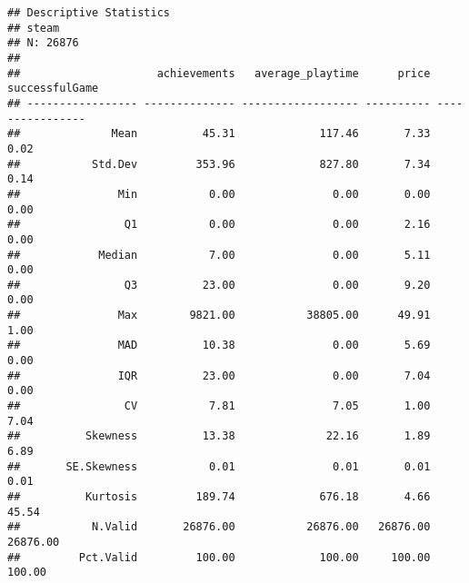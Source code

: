 \documentclass[]{article}
\begin{document}
\begin{verbatim}
## Descriptive Statistics  
## steam  
## N: 26876  
## 
##                     achievements   average_playtime      price   successfulGame
## ----------------- -------------- ------------------ ---------- ----------------
##              Mean          45.31             117.46       7.33             0.02
##           Std.Dev         353.96             827.80       7.34             0.14
##               Min           0.00               0.00       0.00             0.00
##                Q1           0.00               0.00       2.16             0.00
##            Median           7.00               0.00       5.11             0.00
##                Q3          23.00               0.00       9.20             0.00
##               Max        9821.00           38805.00      49.91             1.00
##               MAD          10.38               0.00       5.69             0.00
##               IQR          23.00               0.00       7.04             0.00
##                CV           7.81               7.05       1.00             7.04
##          Skewness          13.38              22.16       1.89             6.89
##       SE.Skewness           0.01               0.01       0.01             0.01
##          Kurtosis         189.74             676.18       4.66            45.54
##           N.Valid       26876.00           26876.00   26876.00         26876.00
##         Pct.Valid         100.00             100.00     100.00           100.00
\end{verbatim}
\end{document}
